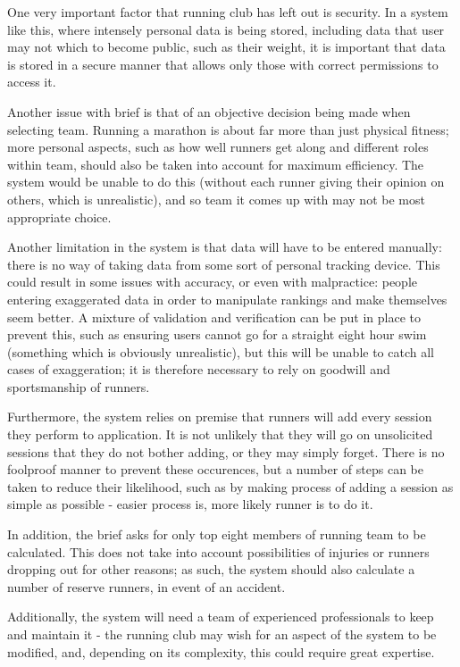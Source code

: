 \documentclass{article}[12pt,a4paper]
\begin{document}
One very important factor that running club has left out is security. In a system like this, where intensely personal data is being stored, including data that user may not which to become public, such as their weight, it is important that data is stored in a secure manner that allows only those with correct permissions to access it. 

Another issue with brief is that of an objective decision being made when selecting team. Running a marathon is about far more than just physical fitness; more personal aspects, such as how well runners get along and different roles within team, should also be taken into account for maximum efficiency. The system would be unable to do this (without each runner giving their opinion on others, which is unrealistic), and so team it comes up with may not be most appropriate choice. 

Another limitation in the system is that data will have to be entered manually: there is no way of taking data from some sort of personal tracking device. This could result in some issues with accuracy, or even with malpractice: people entering exaggerated data in order to manipulate rankings and make themselves seem better. A mixture of validation and verification can be put in place to prevent this, such as ensuring users cannot go for a straight eight hour swim (something which is obviously unrealistic), but this will be unable to catch all cases of exaggeration; it is therefore necessary to rely on goodwill and sportsmanship of runners.

Furthermore, the system relies on premise that runners will add every session they perform to application. It is not unlikely that they will go on unsolicited sessions that they do not bother adding, or they may simply forget. There is no foolproof manner to prevent these occurences, but a number of steps can be taken to reduce their likelihood, such as by making process of adding a session as simple as possible - easier process is, more likely runner is to do it.

In addition, the brief asks for only top eight members of running team to be calculated. This does not take into account possibilities of injuries or runners dropping out for other reasons; as such, the system should also calculate a number of reserve runners, in event of an accident.

Additionally, the system will need a team of experienced professionals to keep and maintain it - the running club may wish for an aspect of the system to be modified, and, depending on its complexity, this could require great expertise.
\end{document}

